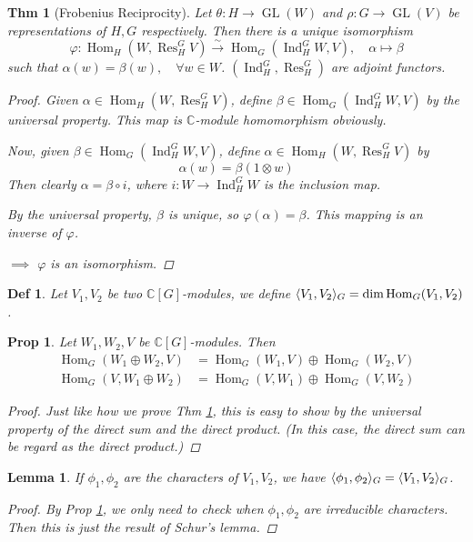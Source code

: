 \documentclass[a4paper]{article}
\DeclarePairedDelimiter{\inpd}{\langle}{\rangle} %
\newcommand*{\Cb}{\mathbb{C}}
\DeclareMathOperator{\Res}{Res}
\DeclareMathOperator{\Ind}{Ind}
\newcommand*\GL[1]{\operatorname{GL}\mathopen{}\left({#1}\right)\mathclose{}}
\DeclareMathOperator{\Hom}{Hom}
\newcommand*\isoto{\xrightarrow{\sim}}
\theoremstyle{mystyle}
\newtheorem{theorem}{Thm}
\newtheorem{lemma}{Lemma}
\newtheorem{definition}{Def}
\newtheorem{prop}{Prop}
\begin{document}
\begin{theorem}[Frobenius Reciprocity]
  \label{thm:frob}
  Let $\theta: H\to \GL{W}$ and $\rho: G\to \GL{V}$ be representations of
  $H, G$ respectively. Then there is a unique isomorphism
  \[
    \varphi: \Hom_H(W, \Res^G_H V) \isoto \Hom_G(\Ind^G_H W, V), \quad
    \alpha \mapsto \beta
  \]
  such that $\alpha(w) = \beta(w), \quad \forall w \in W$.
  $(\Ind^G_H, \Res^G_H)$ are adjoint functors.
  \begin{proof}
    Given $\alpha \in \Hom_H(W, \Res^G_H V)$, define
    $\beta \in \Hom_G(\Ind^G_H W, V)$ by the universal property.
    This map is $\Cb$-module homomorphism obviously.

    Now, given $\beta \in \Hom_G(\Ind^G_H W, V)$, define
    $\alpha \in \Hom_H(W, \Res^G_H V)$ by
    \[
      \alpha(w) = \beta(1\otimes w)
    \]
    Then clearly $\alpha = \beta \circ i$, where $i: W\to \Ind^G_H W$ is the
    inclusion map.

    By the universal property, $\beta$ is unique, so $\varphi(\alpha) = \beta$.
    This mapping is an inverse of $\varphi$.
    
    $\implies$ $\varphi$ is an isomorphism.
  \end{proof}
\end{theorem}

\begin{definition}
  Let $V_1, V_2$ be two $\Cb[G]$-modules, we define
  $\inpd{V_1, V_2}_G = \dim \Hom_G(V_1, V_2)$.
\end{definition}

\begin{prop}
  \label{prop:dimop}
  Let $W_1, W_2, V$ be $\Cb[G]$-modules. Then
  \begin{align*}
    \Hom_G(W_1 \oplus W_2, V) &= \Hom_G(W_1, V) \oplus \Hom_G(W_2, V) \\
    \Hom_G(V, W_1 \oplus W_2) &= \Hom_G(V, W_1) \oplus \Hom_G(V, W_2)
  \end{align*}
  \begin{proof}
    Just like how we prove Thm \ref{thm:frob},
    this is easy to show by the universal property of the direct sum
    and the direct product.
    (In this case, the direct sum can be regard as the direct product.)
  \end{proof}
\end{prop}

\begin{lemma}
  \label{lemma:inpd}
  If $\phi_1, \phi_2$ are the characters of $V_1, V_2$, we have
  $\inpd{\phi_1, \phi_2}_G = \inpd{V_1, V_2}_G$.
  \begin{proof}
    By Prop \ref{prop:dimop}, we only need to check when $\phi_1, \phi_2$
    are irreducible characters.
    Then this is just the result of Schur's lemma.
  \end{proof}
\end{lemma}
\end{document}
